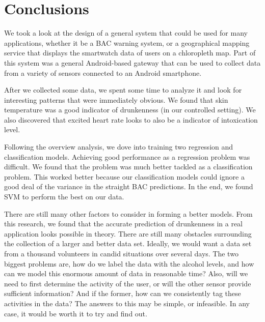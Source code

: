 \section{Conclusions}

We took a look at the design of a general system that could be used for many applications, whether it be a BAC warning system, or a geographical mapping service that displays the smartwatch data of users on a chloropleth map. Part of this system was a general Android-based gateway that can be used to collect data from a variety of sensors connected to an Android smartphone.

After we collected some data, we spent some time to analyze it and look for interesting patterns that were immediately obvious. We found that skin temperature was a good indicator of drunkenness (in our controlled setting). We also discovered that excited heart rate looks to also be a indicator of intoxication level.

Following the overview analysis, we dove into training two regression and classification models. Achieving good performance as a regression problem was difficult. We found that the problem was much better tackled as a classification problem. This worked better because our classification models could ignore a good deal of the variance in the straight BAC predictions. In the end, we found SVM to perform the best on our data.

There are still many other factors to consider in forming a better models. From this research, we found that the accurate prediction of drunkenness in a real application looks possible in theory. There are still many obstacles surrounding the collection of a larger and better data set. Ideally, we would want a data set from a thousand volunteers in candid situations over several days. The two biggest problems are, how do we label the data with the alcohol levels, and how can we model this enormous amount of data in reasonable time? Also, will we need to first determine the activity of the user, or will the other sensor provide sufficient information? And if the former, how can we consistently tag these activities in the data? The answers to this may be simple, or infeasible. In any case, it would be worth it to try and find out.